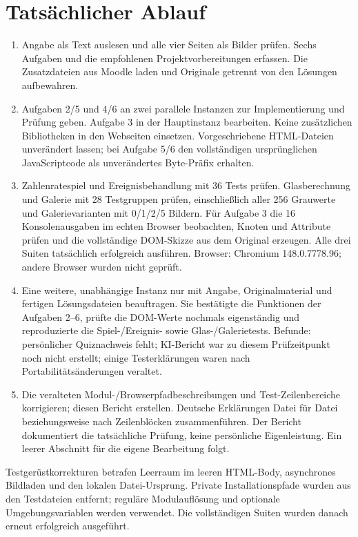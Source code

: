 \documentclass[11pt,a4paper]{article}
\begin{document}
\section*{Tatsächlicher Ablauf}
\begin{enumerate}
\item Angabe als Text auslesen und alle vier Seiten als Bilder prüfen. Sechs Aufgaben und die empfohlenen Projektvorbereitungen erfassen. Die Zusatzdateien aus Moodle laden und Originale getrennt von den Lösungen aufbewahren.
\item Aufgaben 2/5 und 4/6 an zwei parallele Instanzen zur Implementierung und Prüfung geben. Aufgabe 3 in der Hauptinstanz bearbeiten. Keine zusätzlichen Bibliotheken in den Webseiten einsetzen. Vorgeschriebene HTML-Dateien unverändert lassen; bei Aufgabe 5/6 den vollständigen ursprünglichen JavaScriptcode als unverändertes Byte-Präfix erhalten.
\item Zahlenratespiel und Ereignisbehandlung mit 36 Tests prüfen. Glasberechnung und Galerie mit 28 Testgruppen prüfen, einschließlich aller 256 Grauwerte und Galerievarianten mit 0/1/2/5 Bildern. Für Aufgabe 3 die 16 Konsolenausgaben im echten Browser beobachten, Knoten und Attribute prüfen und die vollständige DOM-Skizze aus dem Original erzeugen. Alle drei Suiten tatsächlich erfolgreich ausführen. Browser: Chromium 148.0.7778.96; andere Browser wurden nicht geprüft.
\item Eine weitere, unabhängige Instanz nur mit Angabe, Originalmaterial und fertigen Lösungsdateien beauftragen. Sie bestätigte die Funktionen der Aufgaben 2--6, prüfte die DOM-Werte nochmals eigenständig und reproduzierte die Spiel-/Ereignis- sowie Glas-/Galerietests. Befunde: persönlicher Quiznachweis fehlt; KI-Bericht war zu diesem Prüfzeitpunkt noch nicht erstellt; einige Testerklärungen waren nach Portabilitätsänderungen veraltet.
\item Die veralteten Modul-/Browserpfadbeschreibungen und Test-Zeilenbereiche korrigieren; diesen Bericht erstellen. Deutsche Erklärungen Datei für Datei beziehungsweise nach Zeilenblöcken zusammenführen. Der Bericht dokumentiert die tatsächliche Prüfung, keine persönliche Eigenleistung. Ein leerer Abschnitt für die eigene Bearbeitung folgt.
\end{enumerate}
Testgerüstkorrekturen betrafen Leerraum im leeren HTML-Body, asynchrones Bildladen und den lokalen Datei-Ursprung. Private Installationspfade wurden aus den Testdateien entfernt; reguläre Modulauflösung und optionale Umgebungsvariablen werden verwendet. Die vollständigen Suiten wurden danach erneut erfolgreich ausgeführt.
\end{document}
